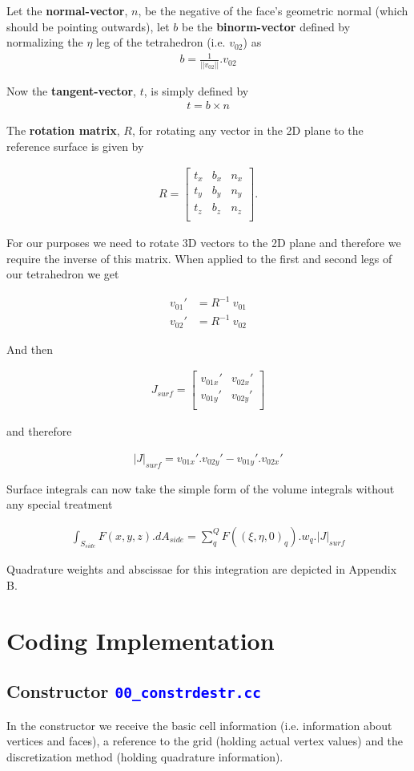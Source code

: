 \documentclass[11pt,letterpaper,titlepage]{article}
\newcommand{\beq}{\begin{equation*}
\begin{aligned}}
\newcommand{\eeq}{\end{aligned}
\end{equation*}}
\newcommand{\beqn}{\begin{equation}
	\begin{aligned}}
\newcommand{\eeqn}{\end{aligned}
	\end{equation}}
\newcommand{\xmltag}[1]{\textcolor{blue}{ \texttt{#1}} }
\begin{document}
Let the \textbf{normal-vector}, $n$, be the negative of the face's geometric normal (which should be pointing outwards), let $b$ be the \textbf{binorm-vector} defined by normalizing the $\eta$ leg of the tetrahedron (i.e. $v_{02}$) as 
\beq 
b = \frac{1}{||v_{02}||} .v_{02}
\eeq

Now the \textbf{tangent-vector}, $t$,  is simply defined by
\beq 
t = b\times n
\eeq 

The \textbf{rotation matrix}, $R$, for rotating any vector in the 2D plane to the reference surface is given by

\beqn
R = 
\begin{bmatrix}
t_x &b_x &n_x \\
t_y &b_y &n_y \\
t_z &b_z &n_z \\
\end{bmatrix}.
\eeqn 

For our purposes we need to rotate 3D vectors to the 2D plane and therefore we require the inverse of this matrix. When applied to the first and second legs of our tetrahedron we get

\beqn 
v_{01}' &= R^{-1} \ v_{01} \\
v_{02}' &= R^{-1} \ v_{02}
\eeqn 

And then 

\beq 
J_{surf} = 
\begin{bmatrix}
v_{01x}' &v_{02x}' \\
v_{01y}' &v_{02y}' \\
\end{bmatrix}
\eeq 

and therefore

\beqn 
|J|_{surf} = v_{01x}'.v_{02y}'  - v_{01y}' .v_{02x}' 
\eeqn 

Surface integrals can now take the simple form of the volume integrals without any special treatment

\beqn 
\int_{S_{side}}
F(x,y,z) .dA_{side}
= \sum_q^Q  F((\xi,\eta,0)_q).w_q.|J|_{surf}
\eeqn

Quadrature weights and abscissae for this integration are depicted in Appendix B.






\newpage 
{}
\section{Coding Implementation}

\subsection{Constructor \xmltag{00\_constrdestr.cc}}
In the constructor we receive the basic cell information (i.e. information about vertices and faces), a reference to the grid (holding actual vertex values) and the discretization method (holding quadrature information).
\end{document}
